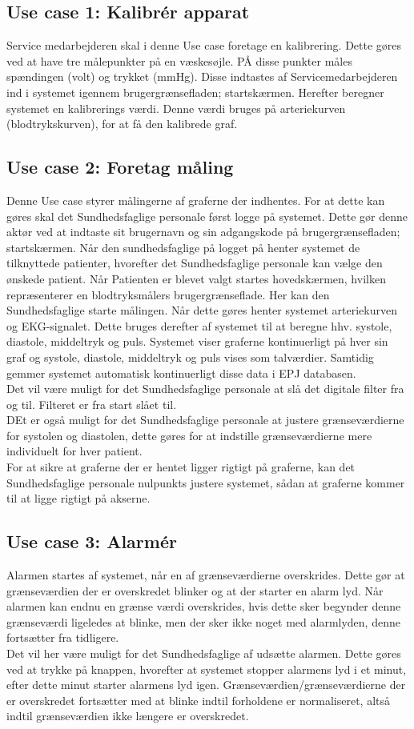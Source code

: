 \subsection{Use case 1: Kalibrér apparat}
Service medarbejderen skal i denne Use case foretage en kalibrering. Dette gøres ved at have tre målepunkter på en væskesøjle. PÅ disse punkter måles spændingen (volt) og trykket (mmHg). Disse indtastes af Servicemedarbejderen ind i systemet igennem brugergrænsefladen; startskærmen. Herefter beregner systemet en kalibrerings værdi. Denne værdi bruges på arteriekurven (blodtrykskurven), for at få den kalibrede graf.
\subsection{Use case 2: Foretag måling}
Denne Use case styrer målingerne af graferne der indhentes. For at dette kan gøres skal det Sundhedsfaglige personale først logge på systemet. Dette gør denne aktør ved at indtaste sit brugernavn og sin adgangskode på brugergrænsefladen; startskærmen. Når den sundhedsfaglige på logget på henter systemet de tilknyttede patienter, hvorefter det Sundhedsfaglige personale kan vælge den ønskede patient. Når Patienten er blevet valgt startes hovedskærmen, hvilken repræsenterer en blodtryksmålers brugergrænseflade. Her kan den Sundhedsfaglige starte målingen. Når dette gøres henter systemet arteriekurven og EKG-signalet. Dette bruges derefter af systemet til at beregne hhv. systole, diastole, middeltryk og puls. Systemet viser graferne kontinuerligt på hver sin graf og systole, diastole, middeltryk og puls vises som talværdier. Samtidig gemmer systemet automatisk kontinuerligt disse data i EPJ databasen. \\
Det vil være muligt for det Sundhedsfaglige personale at slå det digitale filter fra og til. Filteret er fra start slået til.\\
DEt er også muligt for det Sundhedsfaglige personale at justere grænseværdierne for systolen og diastolen, dette gøres for at indstille grænseværdierne mere individuelt for hver patient.\\
For at sikre at graferne der er hentet ligger rigtigt på graferne, kan det Sundhedsfaglige personale nulpunkts justere systemet, sådan at graferne kommer til at ligge rigtigt på akserne.
\subsection{Use case 3: Alarmér}
Alarmen startes af systemet, når en af grænseværdierne overskrides. Dette gør at grænseværdien der er overskredet blinker og at der starter en alarm lyd. Når alarmen kan endnu en grænse værdi overskrides, hvis dette sker begynder denne grænseværdi ligeledes at blinke, men der sker ikke noget med alarmlyden, denne fortsætter fra tidligere. \\
Det vil her være muligt for det Sundhedsfaglige af udsætte alarmen. Dette gøres ved at trykke på knappen, hvorefter at systemet stopper alarmens lyd i et minut, efter dette minut starter alarmens lyd igen. Grænseværdien/grænseværdierne der er overskredet fortsætter med at blinke indtil forholdene er normaliseret, altså indtil grænseværdien ikke længere er overskredet.
